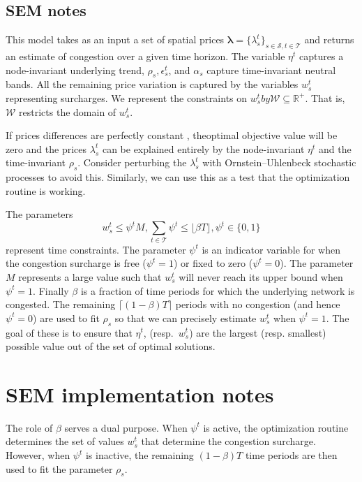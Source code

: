 \documentclass[11pt, letterpaper,nounbold]{article}
\renewcommand{\S}{\mathcal{S}}
\newcommand{\T}{\mathcal{T}}
\begin{document}
\subsection{SEM notes}
This model takes as an input a set of spatial prices $\pmb{\lambda} = \{\lambda_{s}^{t}\}_{s\in \S, t\in \T}$ and returns an estimate of congestion over a given time horizon. The variable $\eta^{t}$ captures a node-invariant underlying trend, $\rho_{s}, \epsilon_{s}^{t}$, and $\alpha_{s}$ capture time-invariant neutral bands. All the remaining price variation is captured by the variables $w_{s}^{t}$ representing surcharges. We represent the constraints on $w_{s}^{t} by \mathcal{W}\subseteq \mathbb{R}^{+}$. That is, $\mathcal{W}$ restricts the domain of $w_{s}^{t}$.

If prices differences are perfectly constant , theoptimal objective value will be zero and the prices $\lambda_{s}^{t}$ can be explained entirely by the node-invariant $\eta^{t}$ and the time-invariant $\rho_{s}$. Consider perturbing the $\lambda_{s}^{t}$ with Ornstein--Uhlenbeck stochastic processes to avoid this. Similarly, we can use this as a test that the optimization routine is working.

The parameters
	\[w_{s}^{t} \leq \psi^{t} M, \sum_{t\in \T} \psi^{t} \leq \lfloor \beta T\rfloor, \psi^{t} \in \{0,1\}\]
represent time constraints. The parameter $\psi^{t}$ is an indicator variable for when the congestion surcharge is free ($\psi^{t} =1$) or fixed to zero ($\psi^{t} = 0$). The parameter $M$ represents a large value such that $w_{s}^{t}$ will never reach its upper bound when $\psi^{t} = 1$. Finally $\beta$ is a fraction of time periods for which the underlying network is congested. The remaining $\lceil (1-\beta) T\rceil$ periods with no congestion (and hence $\psi^{t} = 0$) are used to fit $\rho_{s}$  so that we can precisely estimate $w_{s}^{t}$ when $\psi^{t} = 1$. The goal of these is to ensure that $\eta^{t}$, (resp.~$w_{s}^{t}$) are the largest (resp. smallest) possible value out of the set of optimal solutions.
\section{SEM implementation notes}
The role of $\beta$ serves a dual purpose. When $\psi^{t}$ is active, the optimization routine determines the set of values $w_{s}^{t}$ that determine the congestion surcharge. However, when $\psi^{t}$ is inactive, the remaining $(1-\beta)T$ time periods are then used to fit the parameter $\rho_{s}$.
\end{document}
